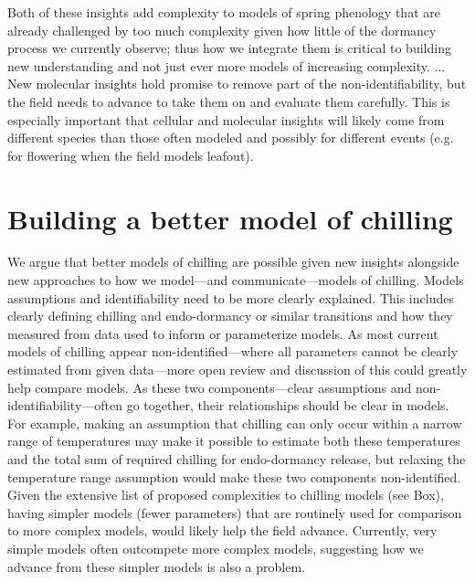 \documentclass[11pt]{article}
\begin{document}

Both of these insights add complexity to models of spring phenology that are already challenged by too much complexity given how little of the dormancy process we currently observe; thus how we integrate them is critical to building new understanding and not just ever more models of increasing complexity. ... New molecular insights hold promise to remove part of the non-identifiability, but the field needs to advance to take them on and evaluate them carefully. This is especially important that cellular and molecular insights will likely come from different species than those often modeled and possibly for different events (e.g. for flowering when the field models leafout). 

\section*{Building a better model of chilling} %

We argue that better models of chilling are possible given new insights alongside new approaches to how we model---and communicate---models of chilling. Models assumptions and identifiability need to be more clearly explained. This includes clearly defining chilling and endo-dormancy or similar transitions and how they measured from data used to inform or parameterize models. As most current models of chilling appear non-identified---where all parameters cannot be clearly estimated from given data---more open review and discussion of this could greatly help compare models. As these two components---clear assumptions and non-identifiability---often go together, their relationships should be clear in models. For example, making an assumption that chilling can only occur within a narrow range of temperatures may make it possible to estimate both these temperatures and the total sum of required chilling for endo-dormancy release, but relaxing the temperature range assumption would make these two components non-identified. Given the extensive list of proposed complexities to chilling models (see Box), having simpler models (fewer parameters) that are routinely used for comparison to more complex models, would likely help the field advance. Currently, very simple models often outcompete more complex models, suggesting how we advance from these simpler models is also a problem.
\end{document}
